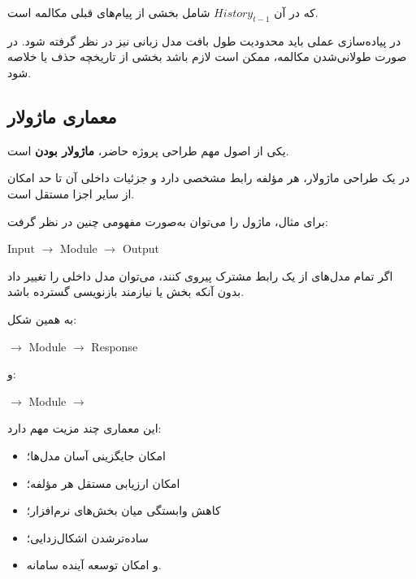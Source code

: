که در آن $History_{t-1}$ شامل بخشی از پیام‌های قبلی مکالمه است.

در پیاده‌سازی عملی باید محدودیت طول بافت مدل زبانی نیز در نظر
گرفته شود.
در صورت طولانی‌شدن مکالمه، ممکن است لازم باشد بخشی از تاریخچه
حذف یا خلاصه شود.


\subsection{معماری ماژولار}

یکی از اصول مهم طراحی پروژه حاضر،
\textbf{ماژولار بودن}
است.

در یک طراحی ماژولار، هر مؤلفه رابط مشخصی دارد و جزئیات داخلی
آن تا حد امکان از سایر اجزا مستقل است.

برای مثال، ماژول  را می‌توان به‌صورت مفهومی چنین در نظر گرفت:

\begin{center}
 Input
$\longrightarrow$
 Module
$\longrightarrow$
 Output
\end{center}

اگر تمام مدل‌های  از یک رابط مشترک پیروی کنند، می‌توان
مدل داخلی را تغییر داد بدون آنکه بخش  یا  نیازمند
بازنویسی گسترده باشد.

به همین شکل:

\begin{center}
$\longrightarrow$
 Module
$\longrightarrow$
Response 
\end{center}

و:

\begin{center}
$\longrightarrow$
 Module
$\longrightarrow$
\end{center}

این معماری چند مزیت مهم دارد:

\begin{itemize}

    \item امکان جایگزینی آسان مدل‌ها؛

    \item امکان ارزیابی مستقل هر مؤلفه؛

    \item کاهش وابستگی میان بخش‌های نرم‌افزار؛

    \item ساده‌ترشدن اشکال‌زدایی؛

    \item و امکان توسعه آینده سامانه.

\end{itemize}

